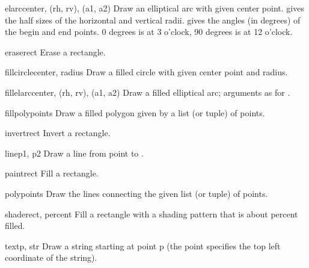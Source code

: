 \begin{methoddesc}[drawing]{elarc}{center, (rh, rv), (a1, a2)}
Draw an elliptical arc with given center point.
gives the half sizes of the horizontal and vertical radii.
gives the angles (in degrees) of the begin and end points.
0 degrees is at 3 o'clock, 90 degrees is at 12 o'clock.
\end{methoddesc}

\begin{methoddesc}[drawing]{erase}{rect}
Erase a rectangle.
\end{methoddesc}

\begin{methoddesc}[drawing]{fillcircle}{center, radius}
Draw a filled circle with given center point and radius.
\end{methoddesc}

\begin{methoddesc}[drawing]{fillelarc}{center, (rh, rv), (a1, a2)}
Draw a filled elliptical arc; arguments as for .
\end{methoddesc}

\begin{methoddesc}[drawing]{fillpoly}{points}
Draw a filled polygon given by a list (or tuple) of points.
\end{methoddesc}

\begin{methoddesc}[drawing]{invert}{rect}
Invert a rectangle.
\end{methoddesc}

\begin{methoddesc}[drawing]{line}{p1, p2}
Draw a line from point
to
.
\end{methoddesc}

\begin{methoddesc}[drawing]{paint}{rect}
Fill a rectangle.
\end{methoddesc}

\begin{methoddesc}[drawing]{poly}{points}
Draw the lines connecting the given list (or tuple) of points.
\end{methoddesc}

\begin{methoddesc}[drawing]{shade}{rect, percent}
Fill a rectangle with a shading pattern that is about
percent filled.
\end{methoddesc}

\begin{methoddesc}[drawing]{text}{p, str}
Draw a string starting at point p (the point specifies the
top left coordinate of the string).
\end{methoddesc}

